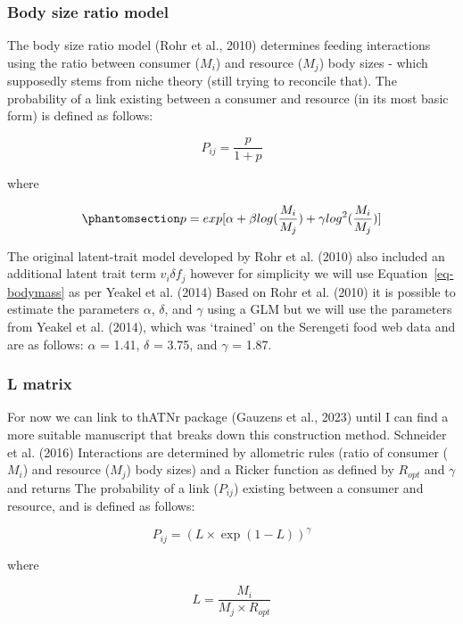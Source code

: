 \documentclass[
]{article}
\begin{document}
\subsubsection{Body size ratio model}\label{body-size-ratio-model}

The body size ratio model (Rohr et al., 2010) determines feeding
interactions using the ratio between consumer (\(M_{i}\)) and resource
(\(M_{j}\)) body sizes - which supposedly stems from niche theory (still
trying to reconcile that). The probability of a link existing between a
consumer and resource (in its most basic form) is defined as follows:

\[
P_{ij} = \frac{p}{1+p}
\]

where

\begin{equation}\phantomsection\label{eq-bodymass}{
p = exp[\alpha + \beta log(\frac{M_{i}}{M_{j}}) + \gamma log^{2}(\frac{M_{i}}{M_{j}})]
}\end{equation}

The original latent-trait model developed by Rohr et al. (2010) also
included an additional latent trait term \(v_{i} \delta f_{j}\) however
for simplicity we will use Equation~\ref{eq-bodymass} as per Yeakel et
al. (2014) Based on Rohr et al. (2010) it is possible to estimate the
parameters \(\alpha\), \(\delta\), and \(\gamma\) using a GLM but we
will use the parameters from Yeakel et al. (2014), which was `trained'
on the Serengeti food web data and are as follows: \(\alpha\) = 1.41,
\(\delta\) = 3.75, and \(\gamma\) = 1.87.

\subsubsection{L matrix}\label{l-matrix}

For now we can link to thATNr package (Gauzens et al., 2023) until I can
find a more suitable manuscript that breaks down this construction
method. Schneider et al. (2016) Interactions are determined by
allometric rules (ratio of consumer (\(M_{i}\)) and resource (\(M_{j}\))
body sizes) and a Ricker function as defined by \(R_{opt}\) and
\(\gamma\) and returns The probability of a link (\(P_{ij}\)) existing
between a consumer and resource, and is defined as follows:

\[
P_{ij} = (L \times \exp(1 - L))^{\gamma}
\]

where

\[
L = \frac{M_{i}}{M_{j} \times R_{opt}}
\]
\end{document}
